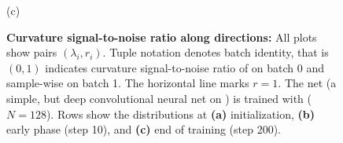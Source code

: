 \begin{figure}[!b]
  \vspace{-2\baselineskip}

  \begin{flushleft}
    \vspace{1ex}
    (c)
  \end{flushleft}
  \vspace{-2\baselineskip}

  \hfill
  \begin{minipage}[t]{0.325\linewidth}
    \centering
    
  \end{minipage}
  \begin{minipage}[t]{0.325\linewidth}
    \centering
    
  \end{minipage}
  \begin{minipage}[t]{0.325\linewidth}
    \centering
    
  \end{minipage}
  \hfill

  \vspace{-1\baselineskip}

  \caption{\textbf{Curvature signal-to-noise ratio along \ggn directions:} All
    plots show pairs $(\lambda_i, r_i)$. Tuple notation denotes batch identity,
    that is $(0,1)$ indicates curvature signal-to-noise ratio of \ggn on batch 0
    and sample-wise \ggn on batch 1. The horizontal line marks $r=1$. The net (a
    simple, but deep convolutional neural net on \mnist) is trained with \sgd
    ($N=128$). Rows show the distributions at \textbf{(a)} initialization,
    \textbf{(b)} early phase (step 10), and \textbf{(c)} end of training (step
    200).}
  \label{fig:curvature-signal-to-noise-ratio}
\end{figure}

